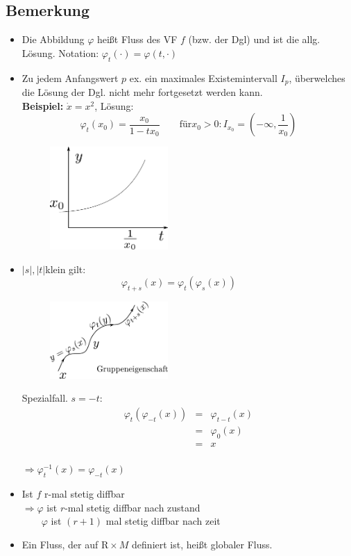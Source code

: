 \documentclass[ngerman]{tudscrreprt}
\begin{document}
\subsection*{Bemerkung}
\begin{itemize}
\item Die Abbildung $\varphi$ heißt Fluss des VF $f$ (bzw. der Dgl) und ist die allg. Lösung. Notation: $\varphi_t(\cdot) = \varphi(t,\cdot)$
\item Zu jedem Anfangswert $p$ ex. ein maximales Existemintervall $I_p$, überwelches die Lösung der Dgl. nicht mehr fortgesetzt werden kann. \\ 
\textbf{Beispiel:} $\dot x = x^2$, Lösung: \begin{equation*}
\varphi_t(x_0) = \frac{x_0}{1-tx_0} \qquad \text{für} x_0 > 0: I_{x_0} = (-\infty,\frac{1}{x_0}) 
\end{equation*}
\begin{figure}[H]
\centering
\def\svgwidth{200pt} 
  \includegraphics[width=4.5cm]{images/image21.pdf}
\end{figure}
\item $|s|, |t|$klein gilt:
\begin{equation*}
\varphi_{t+s}(x) = \varphi_{t}(\varphi_s(x)) \qquad 
\end{equation*}
\begin{figure}[H]
\centering
\def\svgwidth{200pt} 
  \includegraphics[width=4.5cm]{images/image3.pdf}
\end{figure}
Spezialfall. $s= -t:$
\begin{equation*}
\begin{matrix}
\varphi_t(\varphi_{-t}(x)) &=& \varphi_{t-t}(x)\\ 
&=&\varphi_0(x)\\ 
&=&x
\end{matrix}
\end{equation*}\\ 
$\Rightarrow \varphi_t^{-1}(x) = \varphi_{-t}(x)$
\item Ist $f$ r-mal stetig diffbar \\
$\Rightarrow \varphi$ ist $r$-mal stetig diffbar nach zustand\\ 
$\qquad \varphi$ ist $(r+1)$ mal stetig diffbar nach zeit
\item Ein Fluss, der auf $\mathrm{R}\times M$ definiert ist, heißt globaler Fluss.
\end{itemize}
\end{document}
